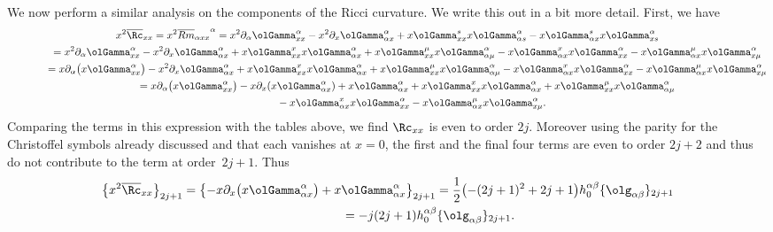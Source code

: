 We now perform a similar analysis on the components of the Ricci curvature. We write this out in a bit more detail. First, we have
\begin{gather*}
x^2 \overline{\Rc}_{xx} = x^2 {\overline{Rm}_{\alpha x x}}^{\alpha} = x^2 \partial_{\alpha} \olGamma_{xx}^{\alpha} - x^2 \partial_{x} \olGamma_{\alpha x}^{\alpha} + x\olGamma_{xx}^{s} x \olGamma_{\alpha s}^{\alpha} - x \olGamma_{\alpha x}^{s} x \olGamma_{x s}^{\alpha} \nonumber\\
\hphantom{x^2 \overline{\Rc}_{xx}}{} = x^2 \partial_{\alpha} \olGamma_{xx}^{\alpha} - x^2 \partial_{x} \olGamma_{\alpha x}^{\alpha} + x\olGamma_{xx}^{x} x\olGamma_{\alpha x}^{\alpha} + x\olGamma_{xx}^{\mu} x\olGamma_{\alpha \mu}^{\alpha} - x\olGamma_{\alpha x}^{x} x\olGamma_{x x}^{\alpha} - x\olGamma_{\alpha x}^{\mu} x\olGamma_{x \mu}^{\alpha}\nonumber\\
\hphantom{x^2 \overline{\Rc}_{xx}}{} = x \partial_{\alpha} \big(x \olGamma_{xx}^{\alpha}\big) - x^2 \partial_{x} \olGamma_{\alpha x}^{\alpha} + x\olGamma_{xx}^{x} x\olGamma_{\alpha x}^{\alpha} + x\olGamma_{xx}^{\mu} x\olGamma_{\alpha \mu}^{\alpha} - x\olGamma_{\alpha x}^{x} x\olGamma_{x x}^{\alpha}
 - x\olGamma_{\alpha x}^{\mu} x\olGamma_{x \mu}^{\alpha}\nonumber\\
\hphantom{x^2 \overline{\Rc}_{xx}}{} = x \partial_{\alpha} \big(x \olGamma_{xx}^{\alpha}\big) - x \partial_{x} (x \olGamma_{\alpha x}^{\alpha} ) + x \olGamma_{\alpha x}^{\alpha} + x\olGamma_{xx}^{x} x\olGamma_{\alpha x}^{\alpha} + x\olGamma_{xx}^{\mu} x\olGamma_{\alpha \mu}^{\alpha}\nonumber\\
\hphantom{x^2 \overline{\Rc}_{xx}=}{} - x\olGamma_{\alpha x}^{x} x\olGamma_{x x}^{\alpha} - x\olGamma_{\alpha x}^{\mu} x\olGamma_{x \mu}^{\alpha}.%
\end{gather*}
Comparing the terms in this expression with the tables above, we find $\Rc_{xx}$ is even to order $2j$. Moreover using the parity for the Christoffel symbols already discussed and that each vanishes at $x=0$, the first and the final four terms are even to order $2j+2$ and thus do not contribute to the term at order~$2j+1$. Thus
\begin{gather}
\big\{ x^2 \overline{\Rc}_{xx} \big\}_{2j+1} = \big\{{-} x \partial_{x} \big(x \olGamma_{\alpha x}^{\alpha}\big) + x \olGamma_{\alpha x}^{\alpha} \big\}_{2j+1}
= \frac{1}{2} \big( {-}(2j+1)^2 + 2j+1 \big) h_0^{\alpha \beta} \{ \olg_{\alpha \beta} \}_{2j+1} \nonumber\\
\hphantom{\big\{ x^2 \overline{\Rc}_{xx} \big\}_{2j+1}}{} = -j (2j+1) h_0^{\alpha \beta} \{ \olg_{\alpha \beta} \}_{2j+1}.\label{eqA.5}
\end{gather}

